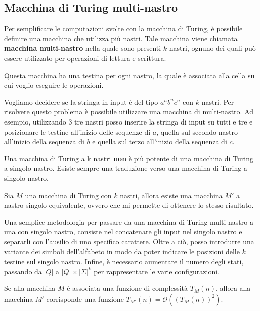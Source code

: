 \subsection{Macchina di Turing multi-nastro}
Per semplificare le computazioni svolte con la macchina di Turing, è possibile
definire una macchina che utilizza più nastri. Tale macchina viene chiamata
\textbf{macchina multi-nastro} nella quale sono presenti $k$ nastri, ognuno dei
quali può essere utilizzato per operazioni di lettura e scrittura.

Questa macchina ha una testina per ogni nastro, la quale è associata  alla cella
su cui voglio eseguire le operazioni.
\begin{esempio} 
    Vogliamo decidere se la stringa in input è del tipo $a^nb^nc^n$ con $k$ nastri.
    Per risolvere questo problema è possibile utilizzare una macchina di multi-nastro.
    Ad esempio, utilizzando 3 tre nastri posso inserire la stringa di input su tutti
    e tre e posizionare le testine all'inizio delle sequenze di $a$, quella sul
    secondo nastro all'inizio della sequenza di $b$ e quella sul terzo all'inizio
    della sequenza di $c$.
\end{esempio}
Una macchina di Turing a k nastri \textbf{non} è più potente di una macchina di Turing
a singolo nastro. Esiste sempre una traduzione verso una macchina di Turing a singolo nastro.
\begin{teorema}
    Sia $M$ una macchina di Turing con $k$ nastri, allora esiste una macchina $M'$
    a nastro singolo equivalente, ovvero che mi permette di ottenere lo stesso risultato.
\end{teorema}
\begin{dimostrazione}
    Una semplice metodologia per passare da una macchina di Turing multi nastro a una
    con singolo nastro, consiste nel concatenare gli input nel singolo nastro e separarli
    con l'ausilio di uno specifico carattere. Oltre a ciò, posso introdurre una variante
    dei simboli dell'alfabeto in modo da poter indicare le posizioni delle $k$ testine
    sul singolo nastro. Infine, è necessario aumentare il numero degli stati, passando
    da $|Q|$ a $|Q| \times |\Sigma|^k$ per rappresentare le varie configurazioni.
\end{dimostrazione}
\begin{teorema}
    Se alla macchina $M$ è associata una funzione di complessità $T_M(n)$, allora
    alla macchina $M'$ corrisponde una funzione $T_{M'}(n) = \mathcal{O}((T_M(n))^2)$.
\end{teorema}
